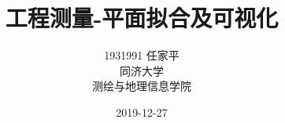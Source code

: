 \documentclass[a4paper, UTF8, 12pt]{article}
\begin{document}
\title{\Huge 工程测量-平面拟合及可视化}
\author{\Large 
        1931991 任家平 \\[12pt]
        同济大学 \\[12pt]
        测绘与地理信息学院}
\date{2019-12-27}
\maketitle
\thispagestyle{empty}



\newpage
{}
\tableofcontents

\newpage
{}






\listoffigures
{}
\listoftables
{}
\newpage
\nocite{*}


\end{document}
